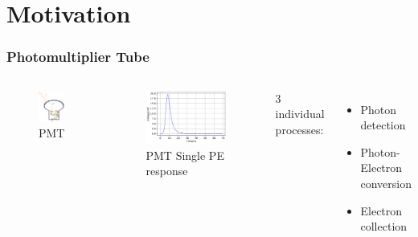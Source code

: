 \documentclass{beamer}
\begin{document}
\section{Motivation}
\begin{frame}
\frametitle{Photomultiplier Tube}
\setlength{\abovecaptionskip}{0mm}
\setlength{\belowcaptionskip}{0mm}
\begin{columns}
\begin{figure}
    \centering
    \caption{PMT}
    \includegraphics[width=0.3\linewidth]{img/PMT.png}
\end{figure}
\begin{figure}
    \centering
    \caption{PMT Single PE response}
    \includegraphics[width=0.9\linewidth]{img/pmtspe.png}
\end{figure}
\begin{center}
    3 individual processes:
\end{center}
\begin{itemize}
    \item Photon detection
    \item Photon-Electron conversion
    \item Electron collection
\end{itemize}
\end{columns}
\end{frame}
\end{document}
